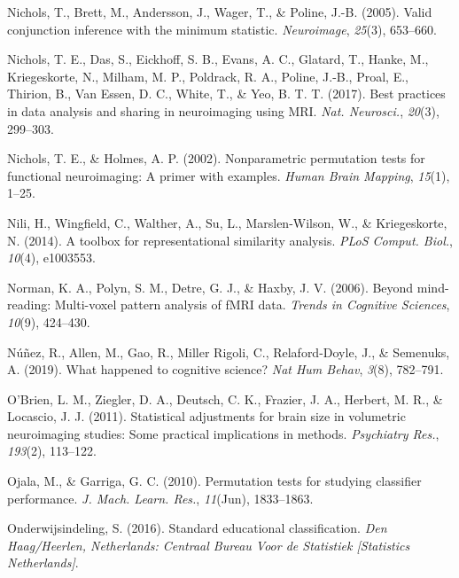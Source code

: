 \documentclass[12pt,american,a4paper,oneside,]{memoir} %
\begin{document}
\leavevmode\hypertarget{ref-nichols2005valid}{}%
Nichols, T., Brett, M., Andersson, J., Wager, T., \& Poline, J.-B. (2005). Valid conjunction inference with the minimum statistic. \emph{Neuroimage}, \emph{25}(3), 653--660.

\leavevmode\hypertarget{ref-Nichols2017-ze}{}%
Nichols, T. E., Das, S., Eickhoff, S. B., Evans, A. C., Glatard, T., Hanke, M., Kriegeskorte, N., Milham, M. P., Poldrack, R. A., Poline, J.-B., Proal, E., Thirion, B., Van Essen, D. C., White, T., \& Yeo, B. T. T. (2017). Best practices in data analysis and sharing in neuroimaging using MRI. \emph{Nat. Neurosci.}, \emph{20}(3), 299--303.

\leavevmode\hypertarget{ref-nichols2002nonparametric}{}%
Nichols, T. E., \& Holmes, A. P. (2002). Nonparametric permutation tests for functional neuroimaging: A primer with examples. \emph{Human Brain Mapping}, \emph{15}(1), 1--25.

\leavevmode\hypertarget{ref-Nili2014-ar}{}%
Nili, H., Wingfield, C., Walther, A., Su, L., Marslen-Wilson, W., \& Kriegeskorte, N. (2014). A toolbox for representational similarity analysis. \emph{PLoS Comput. Biol.}, \emph{10}(4), e1003553.

\leavevmode\hypertarget{ref-norman2006beyond}{}%
Norman, K. A., Polyn, S. M., Detre, G. J., \& Haxby, J. V. (2006). Beyond mind-reading: Multi-voxel pattern analysis of fMRI data. \emph{Trends in Cognitive Sciences}, \emph{10}(9), 424--430.

\leavevmode\hypertarget{ref-Nunez2019-lh}{}%
Núñez, R., Allen, M., Gao, R., Miller Rigoli, C., Relaford-Doyle, J., \& Semenuks, A. (2019). What happened to cognitive science? \emph{Nat Hum Behav}, \emph{3}(8), 782--791.

\leavevmode\hypertarget{ref-OBrien2011-lj}{}%
O'Brien, L. M., Ziegler, D. A., Deutsch, C. K., Frazier, J. A., Herbert, M. R., \& Locascio, J. J. (2011). Statistical adjustments for brain size in volumetric neuroimaging studies: Some practical implications in methods. \emph{Psychiatry Res.}, \emph{193}(2), 113--122.

\leavevmode\hypertarget{ref-Ojala2010-rc}{}%
Ojala, M., \& Garriga, G. C. (2010). Permutation tests for studying classifier performance. \emph{J. Mach. Learn. Res.}, \emph{11}(Jun), 1833--1863.

\leavevmode\hypertarget{ref-Onderwijsindeling2016-tb}{}%
Onderwijsindeling, S. (2016). Standard educational classification. \emph{Den Haag/Heerlen, Netherlands: Centraal Bureau Voor de Statistiek {[}Statistics Netherlands{]}}.
\end{document}
